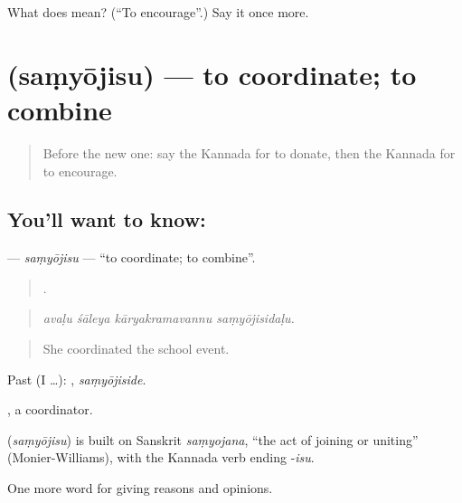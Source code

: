 \begin{tcolorbox}[breakable,colback=teal!4,colframe=teal!35!black,title={Before you move on}]
What does  mean? (\textquotedblleft{}To encourage\textquotedblright{}.) Say it once more.
\end{tcolorbox}
\section[\texorpdfstring{\kn{ಸಂಯೋಜಿಸು} (saṃyōjisu)}{ಸಂಯೋಜಿಸು (saṃyōjisu)}]{ (saṃyōjisu) — to coordinate; to combine}

\label{lesson:KA-C404-samyojisu}



\begin{quote}
Before the new one: say the Kannada for to donate, then the Kannada for to encourage.
\end{quote}

\subsection*{You'll want to know: }
\textbf{} — \emph{saṃyōjisu} — \textquotedblleft{}to coordinate; to combine\textquotedblright{}.

\begin{quote}
   .
\end{quote}

\begin{quote}
\emph{avaḷu śāleya kāryakramavannu saṃyōjisidaḷu.}
\end{quote}

\begin{quote}
She coordinated the school event.
\end{quote}

Past (I …): , \emph{saṃyōjiside}.

, a coordinator.

\begin{cousinweb}
\textbf{} (\emph{saṃyōjisu}) is built on Sanskrit \emph{saṃyojana}, \textquotedblleft{}the act of joining or uniting\textquotedblright{} (Monier-Williams), with the Kannada verb ending -\emph{isu}.
\end{cousinweb}

\begin{grammarlens}[title={What you've built}]
One more word for giving reasons and opinions.
\end{grammarlens}

